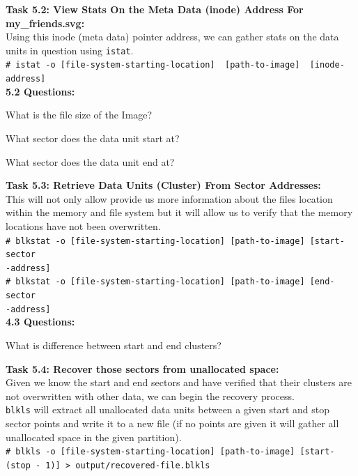 \documentclass[a4paper,11pt]{article}
\begin{document}
{\noindent
\textbf{Task 5.2: View Stats On the Meta Data (inode) Address For my\_friends.svg:}\\
Using this inode (meta data) pointer address, we can gather stats on the data units in question using \texttt{istat}.\\
\verb|# istat -o [file-system-starting-location]  [path-to-image]  [inode-address]|\\

\noindent
\textbf{5.2 Questions:}
\begin{enumerate*}
	\item What is the file size of the Image?
	\item What sector does the data unit start at?
	\item What sector does the data unit end at?\\
\end{enumerate*}	
}
{\noindent
\textbf{Task 5.3: Retrieve Data Units (Cluster) From Sector Addresses:}\\
This will not only allow provide us more information about the files location within the memory and file system but it will allow us to verify that the memory locations have not been overwritten.\\
\texttt{{\#} blkstat -o [file-system-starting-location]  [path-to-image]  [start-sector\\-address]}\\
\noindent
\texttt{{\#} blkstat -o [file-system-starting-location]  [path-to-image]  [end-sector\\-address]}\\

\noindent
\textbf{4.3 Questions:}
\begin{enumerate*}
	\item What is difference between start and end clusters?\\
\end{enumerate*}	
}
{\noindent
\textbf{Task 5.4: Recover those sectors from unallocated space:}\\
Given we know the start and end sectors and have verified that their clusters are not overwritten with other data, we can begin the recovery process.\\

\texttt{blkls} will extract all unallocated data units between a given start and stop sector points and write it to a new file (if no points are given it will gather all unallocated space in the given partition). \\

\noindent
\texttt{{\#} blkls -o [file-system-starting-location]  [path-to-image] [start-(stop - 1)] > output/recovered-file.blkls}
}\\
\end{document}
